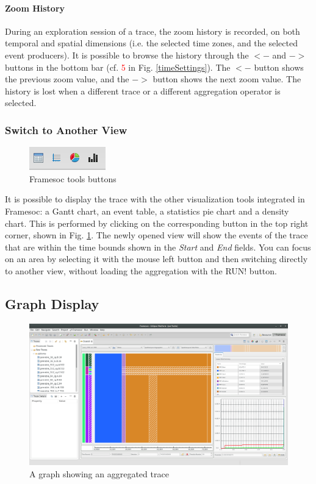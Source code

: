 \documentclass[twoside]{article}
\begin{document}
\begin{sloppypar}
\paragraph{Zoom History}
\label{zHistory}
During an exploration session of a trace, the zoom history is recorded, on both temporal and spatial dimensions (i.e. the selected time zones, and the selected event producers). It is possible to browse the history through the $<-$ and $->$ buttons in the bottom bar (cf. \textcolor{red}{5} in Fig. \ref{timeSettings}). The $<-$ button shows the previous zoom value, and the $->$ button shows the next zoom value. The history is lost when a different trace or a different aggregation operator is selected.

\subsubsection{Switch to Another View}
\begin{figure}[h!]
	\centering
	\includegraphics[scale=1.0]{images/framesoc_buttons.png}
	\caption{Framesoc tools buttons}
	\label{framesocTools}
\end{figure}
It is possible to display the trace with the other visualization tools integrated in Framesoc: a Gantt chart, an event table, a statistics pie chart and a density chart. This is performed by clicking on the corresponding button in the top right corner, shown in Fig. \ref{framesocTools}. The newly opened view will show the events of the trace that are within the time bounds shown in the \textit{Start} and \textit{End} fields. You can focus on an area by selecting it with the mouse left button and then switching directly to another view, without loading the aggregation with the RUN! button. 

\subsection{Graph Display}
\begin{figure}[h!]
	\centering
	\includegraphics[width=1.0\textwidth]{images/ocelotlAggregated.png}
	\caption{A graph showing an aggregated trace}
	\label{showAggreg}
\end{figure}


\end{sloppypar}
\end{document}
